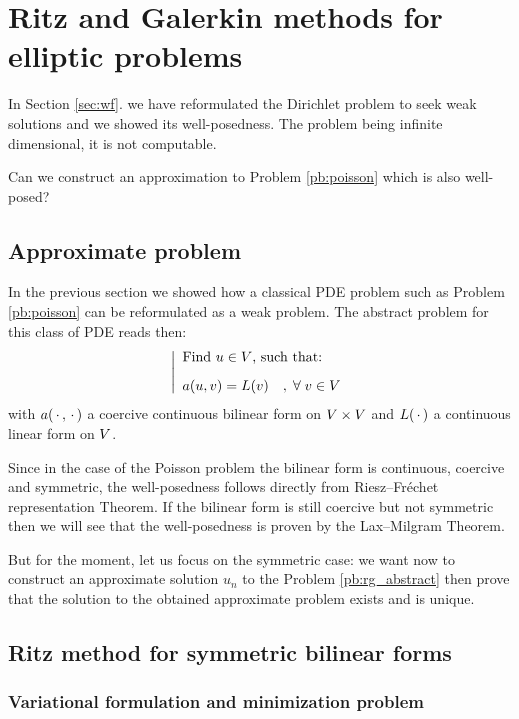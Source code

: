 
\chapter[Ritz and Galerkin for elliptic problems]{Ritz and Galerkin methods for elliptic problems}\label{sec:rg}

In Section \ref{sec:wf}. we have reformulated the Dirichlet problem to seek weak solutions and we showed its well-posedness. The problem being infinite dimensional, it is not computable.

\medskip
\Question Can we construct an approximation to Problem \eqref{pb:poisson} which is also well-posed?

\section{Approximate problem}

In the previous section we showed how a classical PDE problem such as Problem \eqref{pb:poisson} can be reformulated as a weak problem.
The abstract problem for this class of PDE reads then:
\begin{equation}\label{pb:rg_abstract}
\left\lvert
\begin{array}{ll}
\mbox{Find $u \in {V}$, such that:}\\[2ex]
\displaystyle a( u, v ) = L(v)\quad,\;{\forall\;}  v\in {V}
\end{array}
\right .
\end{equation}
with $a(\,{\mathbf\cdot}\,,\,{\mathbf\cdot}\,)$ a coercive continuous bilinear form on ${V}\times{V}$ and $L(\,{\mathbf\cdot}\,)$ a continuous linear form on ${V}$.

\medskip
Since in the case of the Poisson problem the bilinear form is continuous, coercive and symmetric, the well-posedness follows directly from Riesz--Fréchet representation Theorem. If the bilinear form is still coercive but not symmetric then we will see that the well-posedness is proven by the Lax--Milgram Theorem.

But for the moment, let us focus on the symmetric case: we want now to construct an approximate solution $u_n$ to the Problem \eqref{pb:rg_abstract} then prove that the solution to the obtained approximate problem exists and is unique.

\section{Ritz method for symmetric bilinear forms}

\subsection{Variational formulation and minimization problem}

